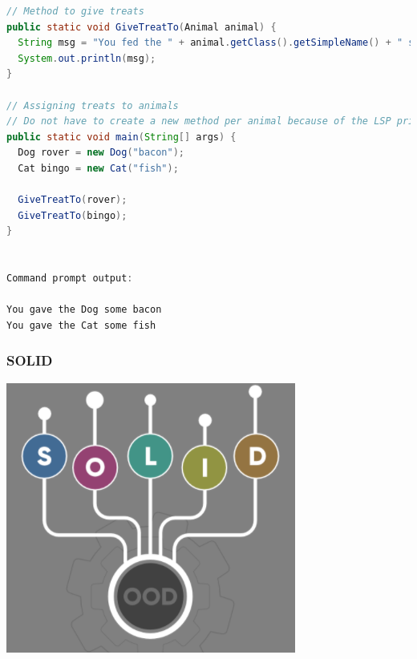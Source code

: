 \documentclass{beamer}
\begin{document}
\vspace{5mm}



\vspace{5mm}

\begin{lstlisting}[language=Java]
// Method to give treats
public static void GiveTreatTo(Animal animal) {
  String msg = "You fed the " + animal.getClass().getSimpleName() + " some "  + animal.favoriteFood;
  System.out.println(msg);
}

// Assigning treats to animals
// Do not have to create a new method per animal because of the LSP principle
public static void main(String[] args) {
  Dog rover = new Dog("bacon");
  Cat bingo = new Cat("fish");

  GiveTreatTo(rover);
  GiveTreatTo(bingo);
}


Command prompt output:

You gave the Dog some bacon
You gave the Cat some fish
\end{lstlisting}


\begin{frame}
\frametitle{SOLID} 

\includegraphics[scale=0.8]{SOLID}
\centering


\end{frame}

\end{document}
